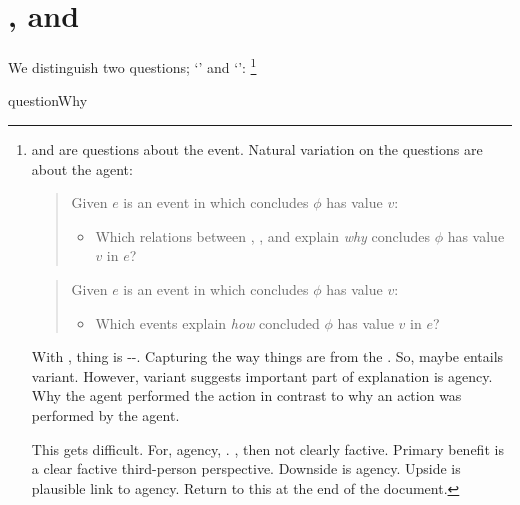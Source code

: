 \section*{\qWhy{}, \qHow{} and \issueInclusion{}}
\label{cha:intro:why-how}

\begin{note}
  We distinguish two questions; `\qWhy{}' and `\qHow{}':%
  \footnote{
    \qWhy{} and \qHow{} are questions about the event.
    Natural variation on the questions are about the agent:

    \begin{quote}
      Given \(e\) is an event in which \vAgent{} concludes \(\phi\) has value \(v\):
    \begin{itemize}
    \item
      Which relations between , , and  explain \emph{why} \vAgent{} concludes \(\phi\) has value \(v\) in \(e\)?
    \end{itemize}
  \end{quote}

  \begin{quote}
    Given \(e\) is an event in which \vAgent{} concludes \(\phi\) has value \(v\):
    \begin{itemize}
    \item
      Which events explain \emph{how} \vAgent{} concluded \(\phi\) has value \(v\) in \(e\)?
    \end{itemize}
  \end{quote}

  With \qWhy{}, thing is --.
  Capturing the way things are from the \agpe{}.
  So, maybe entails variant.
  However, variant suggests important part of explanation is agency.
  Why the agent performed the action in contrast to why an action was performed by the agent.

  This gets difficult.
  For, agency, \agpe{}.
  \agpe{}, then not clearly factive.
  Primary benefit is a clear factive third-person perspective.
  Downside is agency.
  Upside is plausible link to agency.
  Return to this at the end of the document.
  }

  \begin{question}{questionWhy}{\qWhy{}}
    \medskip


\end{question}
\end{note}
